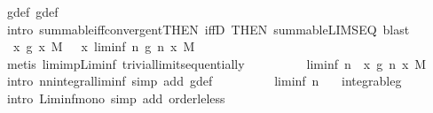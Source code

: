 \begin{isabellebody}
\ g{\isacharunderscore}{\kern0pt}def\ g{\isacharprime}{\kern0pt}{\isacharunderscore}{\kern0pt}def\ \isamarkupfalse%
\ {\isacharparenleft}{\kern0pt}intro\ summable{\isacharunderscore}{\kern0pt}iff{\isacharunderscore}{\kern0pt}convergent{\isacharprime}{\kern0pt}{\isacharbrackleft}{\kern0pt}THEN\ iffD{}{\isacharcomma}{\kern0pt}\ THEN\ summable{\isacharunderscore}{\kern0pt}LIMSEQ{\isacharprime}{\kern0pt}{\isacharbrackright}{\kern0pt}{\isacharcomma}{\kern0pt}\ blast{\isacharparenright}{\kern0pt}\isanewline
\ \ \ \ \isamarkupfalse%
\ {\isachardoublequoteopen}{\isacharparenleft}{\kern0pt}{\isasymintegral}\isactrlsup {\isacharplus}{\kern0pt}\ x{\isachardot}{\kern0pt}\ g{\isacharprime}{\kern0pt}\ x\ {\isasympartial}M{\isacharparenright}{\kern0pt}\ {\isacharequal}{\kern0pt}\ {\isacharparenleft}{\kern0pt}{\isasymintegral}\isactrlsup {\isacharplus}{\kern0pt}\ x{\isachardot}{\kern0pt}\ liminf\ {\isacharparenleft}{\kern0pt}{\isasymlambda}n{\isachardot}{\kern0pt}\ g\ n\ x{\isacharparenright}{\kern0pt}\ {\isasympartial}M{\isacharparenright}{\kern0pt}{\isachardoublequoteclose}\ \isamarkupfalse%
\ {\isacharparenleft}{\kern0pt}metis\ lim{\isacharunderscore}{\kern0pt}imp{\isacharunderscore}{\kern0pt}Liminf\ trivial{\isacharunderscore}{\kern0pt}limit{\isacharunderscore}{\kern0pt}sequentially{\isacharparenright}{\kern0pt}\isanewline
\ \ \ \ \isamarkupfalse%
\ \isamarkupfalse%
\ {\isachardoublequoteopen}{\isachardot}{\kern0pt}{\isachardot}{\kern0pt}{\isachardot}{\kern0pt}\ {\isasymle}\ liminf\ {\isacharparenleft}{\kern0pt}{\isasymlambda}n{\isachardot}{\kern0pt}\ {\isasymintegral}\isactrlsup {\isacharplus}{\kern0pt}\ x{\isachardot}{\kern0pt}\ g\ n\ x\ {\isasympartial}M{\isacharparenright}{\kern0pt}{\isachardoublequoteclose}\ \isamarkupfalse%
\ {\isacharparenleft}{\kern0pt}intro\ nn{\isacharunderscore}{\kern0pt}integral{\isacharunderscore}{\kern0pt}liminf{\isacharcomma}{\kern0pt}\ simp\ add{\isacharcolon}{\kern0pt}\ g{\isacharunderscore}{\kern0pt}def{\isacharparenright}{\kern0pt}\isanewline
\ \ \ \ \isamarkupfalse%
\ \isamarkupfalse%
\ {\isachardoublequoteopen}{\isachardot}{\kern0pt}{\isachardot}{\kern0pt}{\isachardot}{\kern0pt}\ {\isasymle}\ liminf\ {\isacharparenleft}{\kern0pt}{\isasymlambda}n{\isachardot}{\kern0pt}\ {}{\isacharparenright}{\kern0pt}{\isachardoublequoteclose}\ \isamarkupfalse%
\ integrable{\isacharunderscore}{\kern0pt}g\ \isamarkupfalse%
\ {\isacharparenleft}{\kern0pt}intro\ Liminf{\isacharunderscore}{\kern0pt}mono{\isacharparenright}{\kern0pt}\ {\isacharparenleft}{\kern0pt}simp\ add{\isacharcolon}{\kern0pt}\ order{\isacharunderscore}{\kern0pt}le{\isacharunderscore}{\kern0pt}less{\isacharparenright}{\kern0pt}\isanewline

\end{isabellebody}
